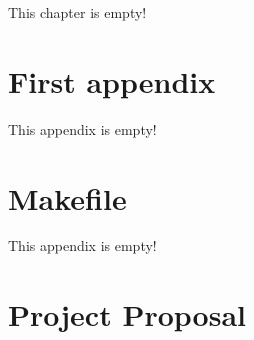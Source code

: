 \documentclass[12pt,a4paper,twoside,openright]{report}
\begin{document}
This chapter is empty!




\appendix

\chapter{First appendix}
 
 This appendix is empty!
 
\chapter{Makefile}

This appendix is empty!

\chapter{Project Proposal}


\end{document}
